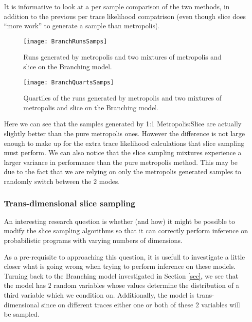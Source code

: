 It is informative to look at a per sample comparison of the two methods, in addition to the previous per trace likelihood compatrison (even though slice does ``more work'' to generate a sample than metropolis).

\begin{figure}[H]
    \centering
    \texttt{[image: BranchRunsSamps]}
    \caption{Runs generated by metropolis and two mixtures of metropolis and slice on the Branching model.}
    \label{fig:BranchRunsSamps}
\end{figure}

\begin{figure}[H]
    \centering
    \texttt{[image: BranchQuartsSamps]}
    \caption{Quartiles of the runs generated by metropolis and two mixtures of metropolis and slice on the Branching model.}
    \label{fig:BranchQuartsSamps}
\end{figure}

Here we can see that the samples generated by 1:1 Metropolis:Slice are actually slightly better than the pure metropolis ones. However the difference is not large enough to make up for the extra trace likelihood calculations that slice sampling must perform. We can also notice that the slice sampling mixtures experience a larger variance in performance than the pure metropolis method. This may be due to the fact that we are relying on only the metropolis generated samples to randomly switch between the 2 modes.

\subsubsection{Trans-dimensional slice sampling}

An interesting research question is whether (and how) it might be possible to modify the slice sampling algorithms so that it can correctly perform inference on probabilistic programs with varying numbers of dimensions.

As a pre-requisite to approaching this question, it is usefull to investigate a little closer what is going wrong when trying to perform inference on these models. Turning back to the Branching model investigated in Section \ref{sec}, we see that the model has 2 random variables whose values determine the distribution of a third variable which we condition on. Additionally, the model is trans-dimensional since on different traces either one or both of these 2 variables will be sampled.

